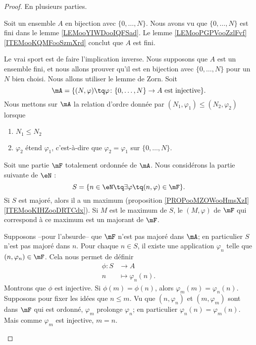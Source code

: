 \begin{proof}
	En plusieurs parties.
	\begin{subproof}
		\spitem[\ref{ITEMooMNMTooEOIjdo}, \( \Leftarrow\)]
		Soit un ensemble \( A\) en bijection avec \( \{ 0,\ldots, N \}\). Nous avons vu que \( \{ 0,\ldots, N \}\) est fini dans le lemme \ref{LEMooYIWDooIQFSad}. Le lemme \ref{LEMooPGPVooZzlFvf}\ref{ITEMooKQMFooSzmXrd} conclut que \( A\) est fini.

		\spitem[\ref{ITEMooMNMTooEOIjdo}, \( \Rightarrow\)]
		Le vrai sport est de faire l'implication inverse. Nous supposons que \( A\) est un ensemble fini, et nous allons prouver qu'il est en bijection avec \( \{ 0,\ldots, N \}\) pour un \( N\) bien choisi. Nous allons utiliser le lemme de Zorn. Soit
		\begin{equation}
			\mA=\{ (N,\varphi)\tq  \varphi\colon \{ 0,\ldots, N \}\to A\text{ est injective} \}.
		\end{equation}
		Nous mettons sur \( \mA\) la relation d'ordre donnée par \( (N_1,\varphi_1)\leq (N_2,\varphi_2)\) lorsque
		\begin{enumerate}
			\item
			      \( N_1\leq N_2\)
			\item
			      \( \varphi_2\) étend \( \varphi_1\), c'est-à-dire que \( \varphi_2=\varphi_1\) sur \( \{ 0,\ldots, N \}\).
		\end{enumerate}
		\begin{subproof}
			Soit une partie \( \mF\) totalement ordonnée de \( \mA\). Nous considérons la partie suivante de \( \eN\) :
			\begin{equation}
				S=\{ n\in \eN\tq \exists  \varphi \tq (n,\varphi)\in \mF \}.
			\end{equation}
			Si \( S\) est majoré, alors il a un maximum (proposition \ref{PROPooMZOWooHmsXzI}\ref{ITEMooKIHZooDRTCdx}). Si \( M\) est le maximum de \( S\), le \( (M,\varphi)\) de \( \mF\) qui correspond à ce maximum est un majorant de \( \mF\).

			Supposons --pour l'absurde-- que \( \mF\) n'est pas majoré dans \( \mA\); en particulier \( S\) n'est pas majoré dans \( n\). Pour chaque \( n\in S\), il existe une application \( \varphi_n\) telle que \( (n,\varphi_n)\in\mF\). Cela nous permet de définir
			\begin{equation}
				\begin{aligned}
					\phi\colon S & \to A                 \\
					n            & \mapsto \varphi_n(n).
				\end{aligned}
			\end{equation}
			Montrons que \( \phi\) est injective. Si \( \phi(m)=\phi(n)\), alors \( \varphi_m(m)=\varphi_n(n)\). Supposons pour fixer les idées que \( n\leq m\). Vu que \( (n,\varphi_n)\) et \( (m,\varphi_m)\) sont dans \( \mF\) qui est ordonné, \( \varphi_m\) prolonge \( \varphi_n\); en particulier \( \varphi_n(n)=\varphi_m(n)\). Mais comme \( \varphi_m\) est injective, \( m=n\).


\end{subproof}
\end{subproof}
\end{proof}
